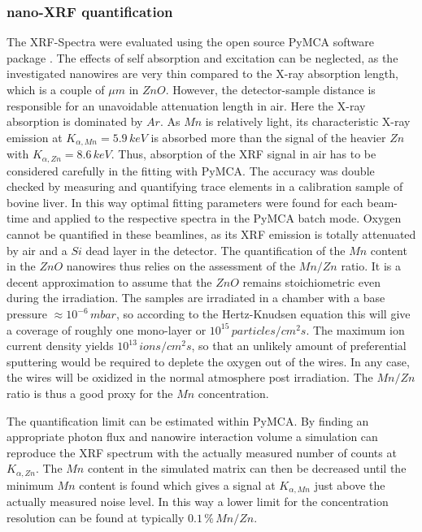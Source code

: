 \subsubsection{nano-XRF quantification}

The XRF-Spectra were evaluated using the open source PyMCA software package \cite{sole_multiplatform_2007}. The effects of self absorption and excitation can be neglected, as the investigated nanowires are very thin compared to the X-ray absorption length, which is a couple of $\mu m$ in $ZnO$. However, the detector-sample distance is responsible for an unavoidable attenuation length in air. Here the X-ray absorption is dominated by $Ar$. As $Mn$ is relatively light, its characteristic X-ray emission at $K_{\alpha,Mn} = 5.9\,keV$ is absorbed more than the signal of the heavier $Zn$ with $K_{\alpha,Zn} = 8.6\,keV$. Thus, absorption of the XRF signal in air has to be considered carefully in the fitting with PyMCA. The accuracy was double checked by measuring and quantifying trace elements in a calibration sample of bovine liver. In this way optimal fitting parameters were found for each beam-time and applied to the respective spectra in the PyMCA batch mode. Oxygen cannot be quantified in these beamlines, as its XRF emission is totally attenuated by air and a $Si$ dead layer in the detector. The quantification of the $Mn$ content in the $ZnO$ nanowires thus relies on the assessment of the $Mn/Zn$ ratio. It is a decent approximation to assume that the $ZnO$ remains stoichiometric even during the irradiation. The samples are irradiated in a chamber with a base pressure $\approx 10^{-6}\,mbar$, so according to the Hertz-Knudsen equation this will give a coverage of roughly one mono-layer or $10^{15}\,particles/cm^2s$. The maximum ion current density yields $10^{13}\,ions/cm^2s$, so that an unlikely amount of preferential sputtering would be required to deplete the oxygen out of the wires. In any case, the wires will be oxidized in the normal atmosphere post irradiation. The $Mn/Zn$ ratio is thus a good proxy for the $Mn$ concentration.

The quantification limit can be estimated within PyMCA. By finding an appropriate photon flux and nanowire interaction volume a simulation can reproduce the XRF spectrum with the actually measured number of counts at $K_{\alpha,Zn}$. The $Mn$ content in the simulated matrix can then be decreased until the minimum $Mn$ content is found which gives a signal at $K_{\alpha,Mn}$ just above the actually measured noise level. In this way a lower limit for the concentration resolution can be found at typically $0.1\,\%\,Mn/Zn$.



